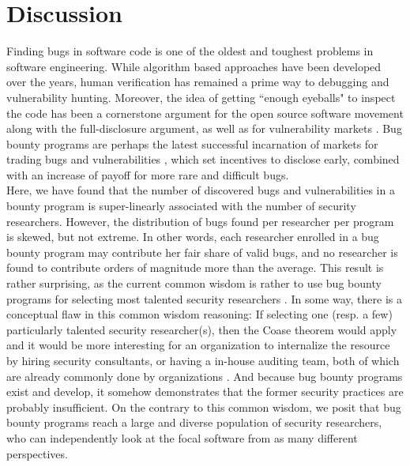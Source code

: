\section{Discussion}
\label{sec:discussion}
Finding bugs in software code is one of the oldest and toughest problems in software engineering. While algorithm based approaches have been developed over the years, human verification has remained a prime way to debugging and vulnerability hunting. Moreover, the idea of getting ``enough eyeballs" to inspect the code has been a cornerstone argument for the open source software movement \cite{raymond1999cathedral} along with the full-disclosure argument, as well as for vulnerability markets \cite{bohme2006comparison}. Bug bounty programs are perhaps the latest successful incarnation of markets for trading bugs and vulnerabilities \cite{bohme2006comparison}, which set incentives to disclose early, combined with an increase of payoff for more rare and difficult bugs.\\

Here, we have found that the number of discovered bugs and vulnerabilities in a bounty program is super-linearly associated with the number of security researchers. However, the distribution of bugs found per researcher per program is skewed, but not extreme. In other words, each researcher enrolled in a bug bounty program may contribute her fair share of valid bugs, and no researcher is found to contribute orders of magnitude more than the average. This result is rather surprising, as the current common wisdom is rather to use bug bounty programs for selecting most talented security researchers \cite{moussouris2016}. In some way, there is a conceptual flaw in this common wisdom reasoning: If selecting one (resp. a few) particularly talented security researcher(s), then the Coase theorem would apply and it would be more interesting for an organization to internalize the resource by hiring security consultants, or having a in-house auditing team, both of which are already commonly done by organizations  \cite{coase1937}. And because bug bounty programs exist and develop, it somehow demonstrates that the former security practices are probably insufficient. On the contrary to this common wisdom, we posit that bug bounty programs reach a large and diverse population of security researchers, who can independently look at the focal software from as many different perspectives. \\

